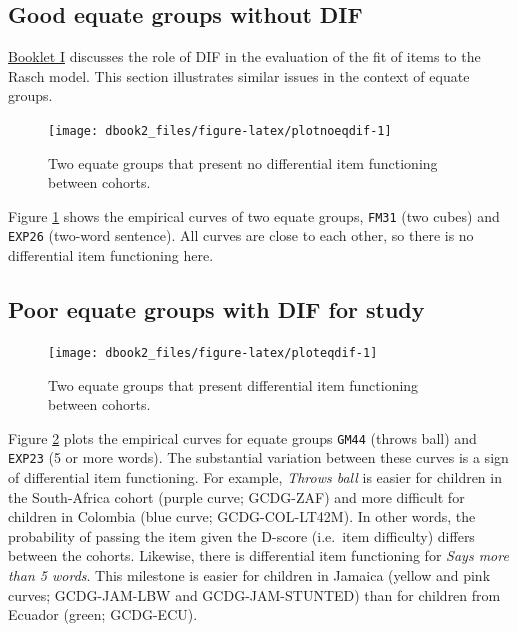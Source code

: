 \documentclass[
]{book}
\begin{document}
\hypertarget{good-equate-groups-without-dif}{%
\subsection{Good equate groups without DIF}\label{good-equate-groups-without-dif}}

\href{https://d-score.org/dbook1/sec-dif.html}{Booklet I} discusses the role of DIF in the evaluation of the fit of items to the Rasch model. This section illustrates similar issues in the context of equate groups.

\begin{figure}

{\centering \texttt{[image: dbook2\_files/figure-latex/plotnoeqdif-1]} 

}

\caption{Two equate groups that present no differential item functioning between cohorts.}\label{fig:plotnoeqdif}
\end{figure}



Figure \ref{fig:plotnoeqdif} shows the empirical curves of two equate groups, \texttt{FM31} (two cubes) and \texttt{EXP26} (two-word sentence). All curves are close to each other, so there is no differential item functioning here.

\hypertarget{poor-equate-groups-with-dif-for-study}{%
\subsection{Poor equate groups with DIF for study}\label{poor-equate-groups-with-dif-for-study}}

\begin{figure}

{\centering \texttt{[image: dbook2\_files/figure-latex/ploteqdif-1]} 

}

\caption{Two equate groups that present differential item functioning between cohorts.}\label{fig:ploteqdif}
\end{figure}



Figure \ref{fig:ploteqdif} plots the empirical curves for equate groups \texttt{GM44} (throws ball) and \texttt{EXP23} (5 or more words). The substantial variation between these curves is a sign of differential item functioning. For example, \emph{Throws ball} is easier for children in the South-Africa cohort (purple curve; GCDG-ZAF) and more difficult for children in Colombia (blue curve; GCDG-COL-LT42M). In other words, the probability of passing the item given the D-score (i.e.~item difficulty) differs between the cohorts. Likewise, there is differential item functioning for \emph{Says more than 5 words}. This milestone is easier for children in Jamaica (yellow and pink curves; GCDG-JAM-LBW and GCDG-JAM-STUNTED) than for children from Ecuador (green; GCDG-ECU).
\end{document}
